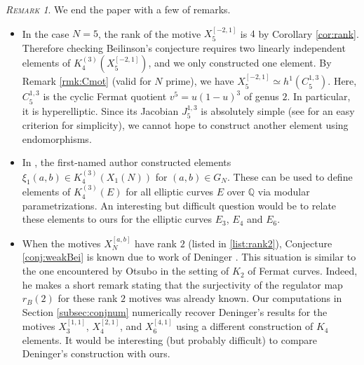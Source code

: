 \documentclass[11pt,a4,leqno]{amsart}
\theoremstyle{my theoremstyle}
\theoremstyle{dfn}
\theoremstyle{remark}
\newtheorem{rmk}[thm]{{\scshape Remark}}
\renewcommand{\1}{\mathbbm{1}}
\newcommand{\Q}{\mathbb{Q}}
\numberwithin{equation}{section}
\begin{document}
\begin{rmk}We end the paper with a few of remarks.
\begin{itemize}  
    \item In the case $N=5$, the rank of the motive $X_5^{[-2,1]}$ is $4$ by Corollary \ref{cor:rank}. Therefore checking Beilinson's conjecture requires two linearly independent elements of $K_4^{(3)}(X_5^{[-2,1]})$, and we only constructed one element. By Remark \ref{rmk:Cmot} (valid for $N$ prime), we have $X_5^{[-2,1]}\simeq h^1(C_5^{1,3})$. Here, $C_5^{1,3}$ is the cyclic Fermat quotient $v^5=u(1-u)^3$ of genus $2$. In particular, it is hyperelliptic. Since its Jacobian $J^{1,3}_5$ is absolutely simple (see \cite{koblitzrohrlich} for an easy criterion for simplicity), we cannot hope to construct another element using endomorphisms. 
    \item In \cite[Theorem 7.2]{Bru20}, the first-named author constructed elements $\xi_1(a, b)\in K_4^{(3)}(X_1(N))$ for $(a,b) \in G_N$. These can be used to define elements of $K_4^{(3)}(E)$ for all elliptic curves $E$ over $\Q$ via modular parametrizations. An interesting but difficult question would be to relate these elements to ours for the elliptic curves $E_3$, $E_4$ and $E_6$. 
\item When the motives $X_N^{[a,b]}$ have rank $2$ (listed in \eqref{list:rank2}), Conjecture \ref{conj:weakBei} is known due to work of Deninger \cite{Deninger90}. This situation is similar to the one encountered by Otsubo in the setting of $K_2$ of Fermat curves. Indeed, he makes a short remark \cite[Remark 4.18]{Ots11} stating that the surjectivity of the regulator map $r_B(2)$ for these rank $2$ motives was already known. Our computations in Section \ref{subsec:conjnum} numerically recover Deninger's results for the motives $X^{[1,1]}_3$, $X_4^{[2,1]}$, and $X^{[4,1]}_6$ using a different construction of $K_4$ elements.
It would be interesting (but probably difficult) to compare Deninger's construction with ours. 
\end{itemize}
\end{rmk}
\end{document}
